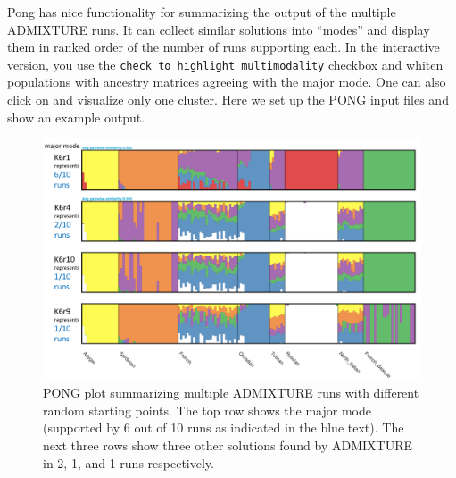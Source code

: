 \documentclass[smallextended]{svmult}       %
\newenvironment{Shaded}{\begin{snugshade}}{\end{snugshade}}
\newcommand{\KeywordTok}[1]{\textcolor[rgb]{0.13,0.29,0.53}{\textbf{#1}}}
\newcommand{\DataTypeTok}[1]{\textcolor[rgb]{0.13,0.29,0.53}{#1}}
\newcommand{\StringTok}[1]{\textcolor[rgb]{0.31,0.60,0.02}{#1}}
\newcommand{\CommentTok}[1]{\textcolor[rgb]{0.56,0.35,0.01}{\textit{#1}}}
\newcommand{\FunctionTok}[1]{\textcolor[rgb]{0.00,0.00,0.00}{#1}}
\newcommand{\VariableTok}[1]{\textcolor[rgb]{0.00,0.00,0.00}{#1}}
\newcommand{\OperatorTok}[1]{\textcolor[rgb]{0.81,0.36,0.00}{\textbf{#1}}}
\newcommand{\ExtensionTok}[1]{#1}
\newcommand{\NormalTok}[1]{#1}
\begin{document}
Pong has nice functionality for summarizing the output of the multiple
ADMIXTURE runs. It can collect similar solutions into ``modes'' and
display them in ranked order of the number of runs supporting each. In
the interactive version, you use the
\texttt{check\ to\ highlight\ multimodality} checkbox and whiten
populations with ancestry matrices agreeing with the major mode. One can
also click on and visualize only one cluster. Here we set up the PONG
input files and show an example output.

\begin{Shaded}
\end{Shaded}

\begin{figure}
\includegraphics[width=1\linewidth]{./plot/H938_Euro_LDprune_K6_10runs} \caption{PONG plot summarizing multiple ADMIXTURE runs with different random starting points.  The top row shows the major mode (supported by 6 out of 10 runs as indicated in the blue text).  The next three rows show three other solutions found by ADMIXTURE in 2, 1, and 1 runs respectively.}\label{fig:unnamed-chunk-10}
\end{figure}
\end{document}
